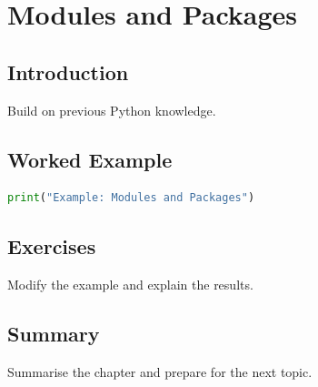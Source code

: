 \chapter{Modules and Packages}
\label{chap:vol3-9}


\section{Introduction}
Build on previous Python knowledge.

\section{Worked Example}
\begin{lstlisting}[language=Python]
print("Example: Modules and Packages")
\end{lstlisting}

\section{Exercises}
\begin{exercise}
Modify the example and explain the results.
\end{exercise}

\section{Summary}
Summarise the chapter and prepare for the next topic.
